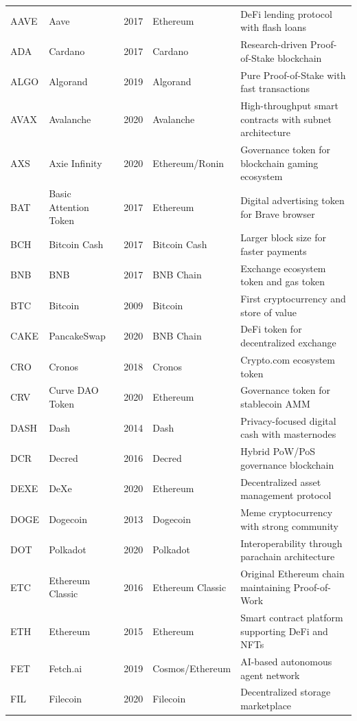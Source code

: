 \documentclass{article}
\begin{document}
\begin{longtable}{llllp{4.2cm}}
AAVE & Aave & 2017 & Ethereum & DeFi lending protocol with flash loans \\[4pt]
ADA & Cardano & 2017 & Cardano & Research-driven Proof-of-Stake blockchain \\[4pt]
ALGO & Algorand & 2019 & Algorand & Pure Proof-of-Stake with fast transactions \\[4pt]
AVAX & Avalanche & 2020 & Avalanche & High-throughput smart contracts with subnet architecture \\[4pt]
AXS & Axie Infinity & 2020 & Ethereum/Ronin & Governance token for blockchain gaming ecosystem \\[4pt]
BAT & Basic Attention Token & 2017 & Ethereum & Digital advertising token for Brave browser \\[4pt]
BCH & Bitcoin Cash & 2017 & Bitcoin Cash & Larger block size for faster payments \\[4pt]
BNB & BNB & 2017 & BNB Chain & Exchange ecosystem token and gas token \\[4pt]
BTC & Bitcoin & 2009 & Bitcoin & First cryptocurrency and store of value \\[4pt]
CAKE & PancakeSwap & 2020 & BNB Chain & DeFi token for decentralized exchange \\[4pt]
CRO & Cronos & 2018 & Cronos & Crypto.com ecosystem token \\[4pt]
CRV & Curve DAO Token & 2020 & Ethereum & Governance token for stablecoin AMM \\[4pt]
DASH & Dash & 2014 & Dash & Privacy-focused digital cash with masternodes \\[4pt]
DCR & Decred & 2016 & Decred & Hybrid PoW/PoS governance blockchain \\[4pt]
DEXE & DeXe & 2020 & Ethereum & Decentralized asset management protocol \\[4pt]
DOGE & Dogecoin & 2013 & Dogecoin & Meme cryptocurrency with strong community \\[4pt]
DOT & Polkadot & 2020 & Polkadot & Interoperability through parachain architecture \\[4pt]
ETC & Ethereum Classic & 2016 & Ethereum Classic & Original Ethereum chain maintaining Proof-of-Work \\[4pt]
ETH & Ethereum & 2015 & Ethereum & Smart contract platform supporting DeFi and NFTs \\[4pt]
FET & Fetch.ai & 2019 & Cosmos/Ethereum & AI-based autonomous agent network \\[4pt]
FIL & Filecoin & 2020 & Filecoin & Decentralized storage marketplace \\[4pt]

\end{longtable}
\end{document}

